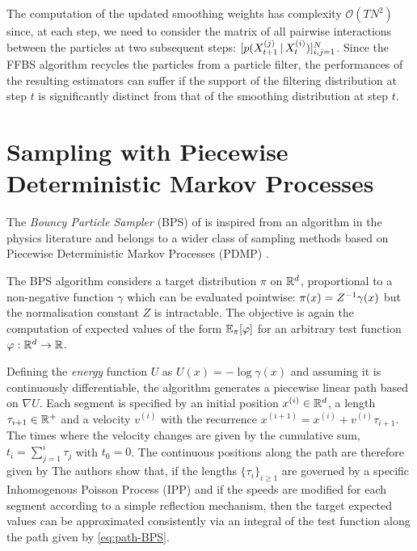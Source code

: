 The computation of the updated smoothing weights has complexity $\mathcal O(TN^{2})$ since, at each step, we need to consider the matrix of all pairwise interactions between the particles at two subsequent steps: $[p(X^{(j)}_{t+1}\,|\, X^{(i)}_{t})]_{i,j=1}^{N}$. Since the FFBS algorithm recycles the particles from a particle filter, the performances of the resulting estimators can suffer if the support of the filtering distribution at step $t$ is significantly distinct from that of the smoothing distribution at step $t$.




\section{\label{point:BPS}Sampling with Piecewise Deterministic Markov Processes}
The \emph{Bouncy Particle Sampler} (BPS) of \citet{bouchard15} is inspired from an algorithm in the physics literature \citep{peters12} and belongs to a wider class of sampling methods based on Piecewise Deterministic Markov Processes (PDMP) \citep{bierkens16, bierkens17, wu17, vanetti17}.

The BPS algorithm considers a target distribution $\pi$ on $\mathbb R^{d}$, proportional to a non-negative function $\gamma$ which can be evaluated pointwise: $\pi(x) = Z^{-1} \gamma(x)$
but the normalisation constant $Z$ is intractable. 
The objective is again the computation of expected values of the form $\mathbb E_\pi[\varphi]$ for an arbitrary test function $\varphi:\mathbb R^{d}\to \mathbb R$. 

Defining the \emph{energy} function $U$ as $U(x) = -\log \gamma(x)	$
 and assuming it is continuously differentiable, the algorithm generates a piecewise linear path based on $\nabla U$. 
 Each segment is specified by an initial position $x^{(i)}\in \mathbb R^{d}$, a length $\tau_{i+1}\in \mathbb R^{+}$ and a velocity $v^{(i)}$ with the recurrence $x^{(i+1)}=x^{(i)}+v^{(i)}\tau_{i+1}$. The times where the velocity changes are given by the cumulative sum, $t_i=\sum_{j=1}^{i}\tau_j$ with $t_0=0$. The continuous positions along the path are therefore given by
\eqa{	x(t) &=& x^{(i)} + v^{(i)}(t-t_i), \quad\text{for}\quad t\in[t_i,t_{i+1}).	\label{eq:path-BPS}}
The authors show that, if the lengths $\{\tau_{i}\}_{i\ge 1}$ are governed by a specific Inhomogenous Poisson Process (IPP) and if the speeds are modified for each segment according to a simple reflection mechanism, then the target expected values can be approximated consistently via an integral of the test function along the path given by \eqref{eq:path-BPS}.

